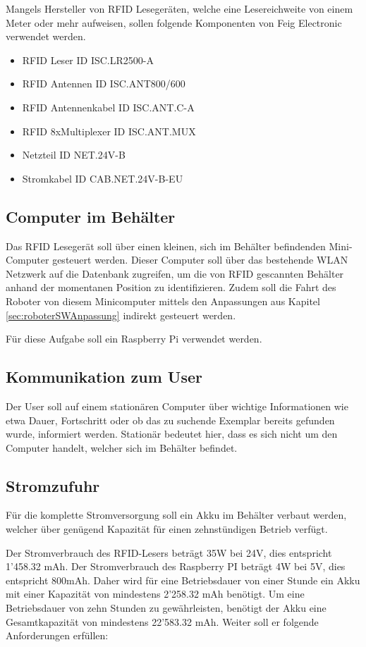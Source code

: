 Mangels Hersteller von RFID Lesegeräten, welche eine Lesereichweite von einem Meter oder mehr aufweisen, sollen folgende Komponenten von Feig Electronic verwendet werden. 
\begin{itemize}
	\item RFID Leser ID ISC.LR2500-A
	\item RFID Antennen ID ISC.ANT800/600
	\item RFID Antennenkabel ID ISC.ANT.C-A
	\item RFID 8xMultiplexer ID ISC.ANT.MUX
	\item Netzteil ID NET.24V-B
	\item Stromkabel ID CAB.NET.24V-B-EU
\end{itemize}

\clearpage
\subsection{Computer im Behälter}
Das RFID Lesegerät soll über einen kleinen, sich im Behälter befindenden Mini-Computer gesteuert werden. Dieser Computer soll über das bestehende WLAN Netzwerk auf die Datenbank zugreifen, um die von RFID gescannten Behälter anhand der momentanen Position zu identifizieren.  
Zudem soll die Fahrt des Roboter von diesem Minicomputer mittels den Anpassungen aus Kapitel  \ref{sec:roboterSWAnpassung} indirekt gesteuert werden.

Für diese Aufgabe soll ein Raspberry Pi verwendet werden.

\subsection{Kommunikation zum User}
Der User soll auf einem stationären Computer über wichtige Informationen wie etwa Dauer, Fortschritt oder ob das zu suchende Exemplar bereits gefunden wurde, informiert werden. Stationär bedeutet hier, dass es sich nicht um den Computer handelt, welcher sich im Behälter befindet.

\subsection{Stromzufuhr}
Für die komplette Stromversorgung soll ein Akku im Behälter verbaut werden, welcher über genügend Kapazität für einen zehnstündigen Betrieb verfügt.

Der Stromverbrauch des RFID-Lesers beträgt 35W bei 24V, dies entspricht 1'458.32 mAh.
Der Stromverbrauch des Raspberry PI beträgt 4W bei 5V, dies entspricht 800mAh.
Daher wird für eine Betriebsdauer von einer Stunde ein Akku mit einer Kapazität von mindestens 2'258.32 mAh benötigt. Um eine Betriebsdauer von zehn Stunden zu gewährleisten, benötigt der Akku eine Gesamtkapazität von mindestens 22'583.32 mAh.
Weiter soll er folgende Anforderungen erfüllen:

